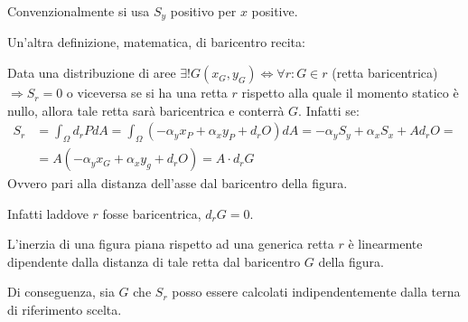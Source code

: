 \documentclass{article}
\begin{document}
\begin{adjustwidth}{2in}{}
	Convenzionalmente si usa $ S_y $ positivo per $ x $ positive. \newline
	
	Un'altra definizione, matematica, di baricentro recita: \newline
	
	Data una distribuzione di aree $\exists! G(x_G, y_G) \Leftrightarrow \forall r : G \in r$ (retta baricentrica) $\Rightarrow  S_r = 0$ o viceversa se si ha una retta $r$ rispetto alla quale il momento statico è nullo, allora tale retta sarà baricentrica e conterrà $G$. 
	\newpage 
	Infatti se:
	\[ \begin{split}
	S_r & = \int_{\Omega} d_r P dA = \int_{\Omega} (-\alpha_y x_P + \alpha_x y_P + d_r O) dA = -\alpha_y S_y + \alpha_x S_x + Ad_r O = \\
	& = A( -\alpha_y x_G + \alpha_x y_g + d_r O) = A\cdot d_r G
	\end{split}\]
Ovvero pari alla distanza dell'asse dal baricentro della figura.

Infatti laddove $r$ fosse baricentrica, $d_r G=0$. \newline 

	L’inerzia di una figura piana rispetto ad una generica retta $ r $ è linearmente dipendente dalla
	distanza di tale retta dal baricentro $ G $ della figura. \newline
	
	Di conseguenza, sia $ G $ che $ S_r $ posso essere calcolati indipendentemente dalla terna di riferimento
	scelta.\newline


\end{adjustwidth}
\end{document}
